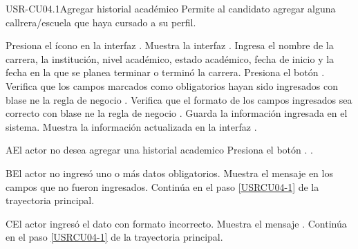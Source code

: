 \begin{UseCase}[]{USR-CU04.1}{Agregar historial académico}{
	Permite al candidato agregar alguna callrera/escuela  que haya cursado a su perfil.
}
\end{UseCase}

\begin{UCtrayectoria}
	\UCpaso [\UCactor] Presiona el ícono \IUAgregar{} en la interfaz .
	\UCpaso Muestra la interfaz .
	\UCpaso [\UCsist] \label{USRCU04-1} Ingresa el nombre de la carrera, la institución, nivel académico, estado académico, fecha de inicio y la fecha en la que se planea terminar o terminó la carrera.
	\UCpaso [\UCsist] Presiona el botón .
	\UCpaso Verifica que los campos marcados como obligatorios hayan sido ingresados con blase ne la regla de negocio .
	\UCpaso Verifica que el formato de los campos ingresados sea correcto con blase ne la regla de negocio .
	\UCpaso Guarda la información ingresada en el sistema.
	\UCpaso Muestra la información actualizada en la interfaz . 
\end{UCtrayectoria}

\begin{UCtrayectoriaA}{A}{El actor no desea agregar una historial academico}
	\UCpaso [\UCsist] Presiona el botón .
	.
\end{UCtrayectoriaA} 

\begin{UCtrayectoriaA}{B}{El actor no ingresó uno o más datos obligatorios.}
	\UCpaso [\UCsist] Muestra el mensaje  en los campos que no fueron ingresados.
	\UCpaso [\UCsist] Continúa en el paso \ref{USRCU04-1} de la trayectoria principal.
\end{UCtrayectoriaA} 

\begin{UCtrayectoriaA}{C}{El actor ingresó el dato con formato incorrecto.}
	\UCpaso [\UCsist] Muestra el mensaje .
	\UCpaso [\UCsist] Continúa en el paso \ref{USRCU04-1} de la trayectoria principal.
\end{UCtrayectoriaA}



